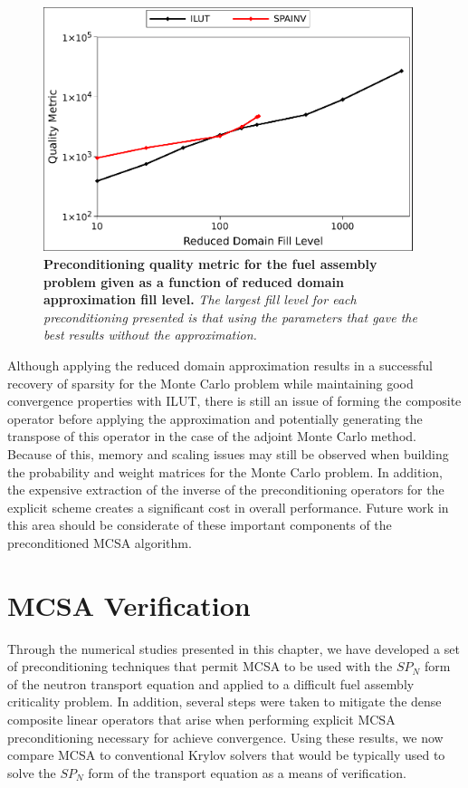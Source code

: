 \begin{figure}[t!]
  \begin{center}
    \includegraphics[width=4.25in]{chapters/spn_equations/rda_quality.pdf}
  \end{center}
  \caption{\textbf{Preconditioning quality metric for the fuel
      assembly problem given as a function of reduced domain
      approximation fill level.} \textit{The largest fill level for
      each preconditioning presented is that using the parameters that
      gave the best results without the approximation.}}
  \label{fig:rda_quality}
\end{figure}

Although applying the reduced domain approximation results in a
successful recovery of sparsity for the Monte Carlo problem while
maintaining good convergence properties with ILUT, there is still an
issue of forming the composite operator before applying the
approximation and potentially generating the transpose of this
operator in the case of the adjoint Monte Carlo method. Because of
this, memory and scaling issues may still be observed when building
the probability and weight matrices for the Monte Carlo problem. In
addition, the expensive extraction of the inverse of the
preconditioning operators for the explicit scheme creates a
significant cost in overall performance. Future work in this area
should be considerate of these important components of the
preconditioned MCSA algorithm.

\section{MCSA Verification}
\label{sec:spn_mcsa_verification}
Through the numerical studies presented in this chapter, we have
developed a set of preconditioning techniques that permit MCSA to be
used with the $SP_N$ form of the neutron transport equation and
applied to a difficult fuel assembly criticality problem. In addition,
several steps were taken to mitigate the dense composite linear
operators that arise when performing explicit MCSA preconditioning
necessary for achieve convergence. Using these results, we now compare
MCSA to conventional Krylov solvers that would be typically used to
solve the $SP_N$ form of the transport equation as a means of
verification.

